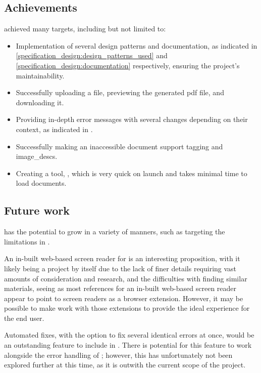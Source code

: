 \subsection{Achievements}
\lintexspaced achieved many targets, including but not limited to:
\begin{itemize}
    \item Implementation of several design patterns and documentation, as indicated in \cref{specification_design:design_patterns_used} and \cref{specification_design:documentation} respectively, ensuring the project's maintainability.
    \item Successfully uploading a \latexspaced file, previewing the generated \acrshort{pdf} file, and downloading it.
    \item Providing in-depth error messages with several changes depending on their context, as indicated in .
    \item Successfully making an inaccessible document support \gls{tagging} and \glspl{image_desc}.
    \item Creating a tool, \lintex , which is very quick on launch and takes minimal time to load documents.
\end{itemize}

\subsection{\nmu Future \nmu work}\label{conc:future_work}
\lintexspaced has the potential to grow in a variety of manners, such as targeting the limitations in .

An in-built web-based screen reader for \lintexspaced is an interesting proposition, with it likely being a project by itself due to the lack of finer details requiring vast amounts of consideration and research, and the difficulties with finding similar materials, seeing as most references for an in-built web-based screen reader appear to point to screen readers as a browser extension. However, it may be possible to make \lintexspaced work with those extensions to provide the ideal experience for the end user.

Automated fixes, with the option to fix several identical errors at once, would be an outstanding feature to include in \lintex . There is potential for this feature to work alongside the error handling of \lintex ; however, this has unfortunately not been explored further at this time, as it is outwith the current scope of the project.


